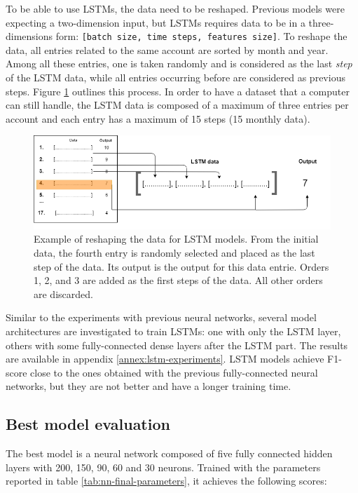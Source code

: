 To be able to use LSTMs, the data need to be reshaped. Previous models were expecting a two-dimension input, but LSTMs requires data to be in a three-dimensions form: \texttt{[batch size, time steps, features size]}. To reshape the data, all entries related to the same account are sorted by month and year. Among all these entries, one is taken randomly and is considered as the last \textit{step} of the LSTM data, while all entries occurring before are considered as previous steps. Figure \ref{fig:lst-data-build} outlines this process. In order to have a dataset that a computer can still handle, the LSTM data is composed of a maximum of three entries per account and each entry has a maximum of 15 steps (15 monthly data).

\begin{figure}[htbp]
    \centering
    \includegraphics[width=12cm]{images/lstm-data-build.png}
    \caption[Data combination for LSTM networks]{Example of reshaping the data for LSTM models. From the initial data, the fourth entry is randomly selected and placed as the last step of the data. Its output is the output for this data entrie. Orders 1, 2, and 3 are added as the first steps of the data. All other orders are discarded.}
    \label{fig:lst-data-build}
\end{figure}

Similar to the experiments with previous neural networks, several model architectures are investigated to train LSTMs: one with only the LSTM layer, others with some fully-connected dense layers after the LSTM part. The results are available in appendix \ref{annex:lstm-experiments}. LSTM models achieve F1-score close to the ones obtained with the previous fully-connected neural networks, but they are not better and have a longer training time.



\subsection{Best model evaluation}
\label{sec:best-model}

The best model is a neural network composed of five fully connected hidden layers with 200, 150, 90, 60 and 30 neurons. Trained with the parameters reported in table \ref{tab:nn-final-parameters}, it achieves the following scores:

